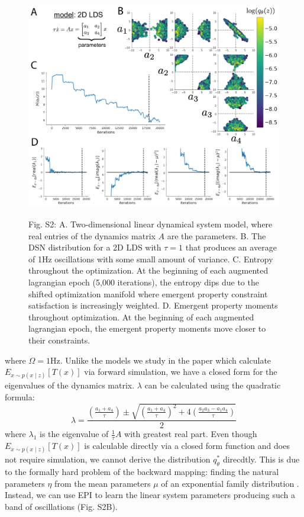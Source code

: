 \documentclass[11pt]{article}
\begin{document}
\begin{figure}
\begin{center}
\includegraphics[scale=0.5]{figures/figS2/figS2.pdf}
\end{center}
\begin{flushleft}
Fig. S2: A. Two-dimensional linear dynamical system model, where real entries of the dynamics matrix $A$ are the parameters.  B. The DSN distribution for a 2D LDS with $\tau=1$ that produces an average of 1Hz oscillations with some small amount of variance.  C. Entropy throughout the optimization.  At the beginning of each augmented lagrangian epoch (5,000 iterations), the entropy dips due to the shifted optimization manifold where emergent property constraint satisfaction is increasingly weighted.  D. Emergent property moments throughout optimization.  At the beginning of each augmented lagrangian epoch, the emergent property moments move closer to their constraints.
\end{flushleft}
\end{figure}

where $\Omega = 1$Hz.  Unlike the models we study in the paper which calculate $E_{x \sim p(x \mid z)} \left[T(x) \right]$ via forward simulation, we have a closed  form for the eigenvalues of the dynamics matrix.  $\lambda$ can be calculated using the quadratic formula: 
\begin{equation}
\lambda = \frac{(\frac{a_1 + a_4}{\tau}) \pm \sqrt{(\frac{a_1+a_4}{\tau})^2 + 4(\frac{a_2 a_3 - a_1 a_4}{\tau})}}{2}
\end{equation}
where $\lambda_1$ is the eigenvalue of $\frac{1}{\tau}A$ with greatest real part.  Even though $E_{x\sim p(x \mid z)}\left[T(x)\right]$ is calculable directly via a closed form function and does not require simulation, we cannot derive the distribution $q^*_\theta$ direcdtly.  This is due to the formally hard problem of the backward mapping: finding the natural parameters $\eta$ from the mean parameters $\mu$ of an exponential family distribution \cite{wainwright2008graphical}.  Instead, we can use EPI to learn the linear system parameters producing such a band of oscillations (Fig. S2B). 
\end{document}
